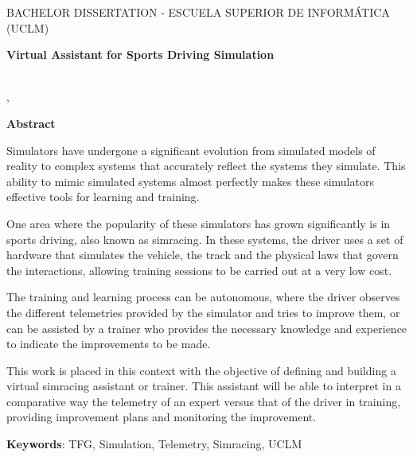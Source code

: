\makeatletter
\begin{center} %
   {\textsc{BACHELOR DISSERTATION - ESCUELA SUPERIOR DE INFORMÁTICA 
   (UCLM)}\par}
   \vspace{1cm} %
   {\textbf{\Large Virtual Assistant for Sports Driving Simulation}\par}
   \vspace{0.4cm} %
   {\@autor \\ \@cityTF,{} \@monthTF{} \@yearTF\par} 
   \vspace{0.9cm} %
   {\textbf{\large\textsf{Abstract}}\par} 
\end{center}   
\makeatother %

Simulators have undergone a significant evolution from simulated models of reality to complex systems that accurately reflect the systems they simulate. This ability to mimic simulated systems almost perfectly makes these simulators effective tools for learning and training.

One area where the popularity of these simulators has grown significantly is in sports driving, also known as simracing. In these systems, the driver uses a set of hardware that simulates the vehicle, the track and the physical laws that govern the interactions, allowing training sessions to be carried out at a very low cost.

The training and learning process can be autonomous, where the driver observes the different telemetries provided by the simulator and tries to improve them, or can be assisted by a trainer who provides the necessary knowledge and experience to indicate the improvements to be made.

This work is placed in this context with the objective of defining and building a virtual simracing assistant or trainer. This assistant will be able to interpret in a comparative way the telemetry of an expert versus that of the driver in training, providing improvement plans and monitoring the improvement.

\bigskip 

\noindent\textbf{Keywords}: TFG, Simulation, Telemetry, Simracing, UCLM

\cleardoublepage %

